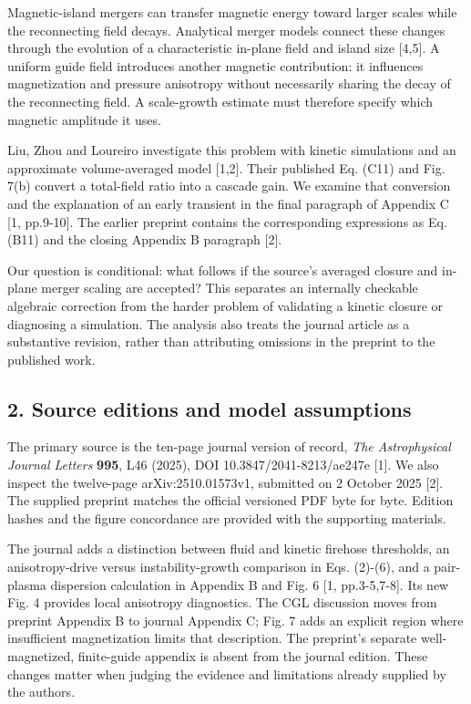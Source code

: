 Magnetic-island mergers can transfer magnetic energy toward larger
scales while the reconnecting field decays. Analytical merger models
connect these changes through the evolution of a characteristic in-plane
field and island size {[}4,5{]}. A uniform guide field introduces
another magnetic contribution: it influences magnetization and pressure
anisotropy without necessarily sharing the decay of the reconnecting
field. A scale-growth estimate must therefore specify which magnetic
amplitude it uses.

Liu, Zhou and Loureiro investigate this problem with kinetic simulations
and an approximate volume-averaged model {[}1,2{]}. Their published Eq.
(C11) and Fig. 7(b) convert a total-field ratio into a cascade gain. We
examine that conversion and the explanation of an early transient in the
final paragraph of Appendix C {[}1, pp.9-10{]}. The earlier preprint
contains the corresponding expressions as Eq. (B11) and the closing
Appendix B paragraph {[}2{]}.

Our question is conditional: what follows if the source's averaged
closure and in-plane merger scaling are accepted? This separates an
internally checkable algebraic correction from the harder problem of
validating a kinetic closure or diagnosing a simulation. The analysis
also treats the journal article as a substantive revision, rather than
attributing omissions in the preprint to the published work.

\subsection{2. Source editions and model
assumptions}\label{source-editions-and-model-assumptions}

The primary source is the ten-page journal version of record, \emph{The
Astrophysical Journal Letters} \textbf{995}, L46 (2025), DOI
10.3847/2041-8213/ae247e {[}1{]}. We also inspect the twelve-page
arXiv:2510.01573v1, submitted on 2 October 2025 {[}2{]}. The supplied
preprint matches the official versioned PDF byte for byte. Edition
hashes and the figure concordance are provided with the supporting
materials.

The journal adds a distinction between fluid and kinetic firehose
thresholds, an anisotropy-drive versus instability-growth comparison in
Eqs. (2)-(6), and a pair-plasma dispersion calculation in Appendix B and
Fig. 6 {[}1, pp.3-5,7-8{]}. Its new Fig. 4 provides local anisotropy
diagnostics. The CGL discussion moves from preprint Appendix B to
journal Appendix C; Fig. 7 adds an explicit region where insufficient
magnetization limits that description. The preprint's separate
well-magnetized, finite-guide appendix is absent from the journal
edition. These changes matter when judging the evidence and limitations
already supplied by the authors.

